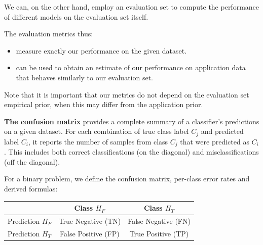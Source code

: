 We can, on the other hand, employ an evaluation set to compute the performance of different models on the evaluation set itself.

The evaluation metrics thus:
\begin{itemize}
  \item measure exactly our performance on the given dataset.
  \item can be used to obtain an estimate of our performance on application data that behaves similarly to our evaluation set.
\end{itemize}

Note that it is important that our metrics do not depend on the evaluation set empirical prior, when this may differ from the application prior.

\textbf{The confusion matrix} provides a complete summary of a classifier's predictions on a given dataset. For each combination of true class label $C_j$ and predicted label $C_i$, it reports the number of samples from class $C_j$ that were predicted as $C_i$. This includes both correct classifications (on the diagonal) and misclassifications (off the diagonal).

\begin{center}
\end{center}

For a binary problem, we define the confusion matrix, per-class error rates and derived formulas:

\begin{center}
\begin{tabular}{l|cc}
 & Class $H_F$ & Class $H_T$ \\
\hline
Prediction $H_F$ & True Negative (TN) & False Negative (FN) \\
Prediction $H_T$ & False Positive (FP) & True Positive (TP)
\end{tabular}
\end{center}


